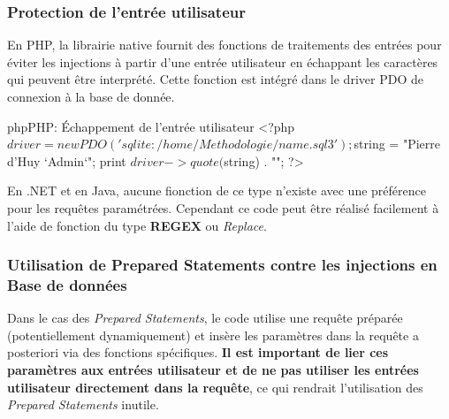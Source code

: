 \subsubsection{Protection de l'entrée utilisateur}
En PHP, la librairie native fournit des fonctions de traitements des entrées pour éviter les injections à partir d'une entrée utilisateur en échappant les caractères qui peuvent être interprété. Cette fonction est intégré dans le driver PDO de connexion à la base de donnée.
\begin{Config}{php}{PHP: Échappement de l'entrée utilisateur}
<?php
$driver = new PDO('sqlite:/home/Methodologie/name.sql3');
$string = "Pierre d'Huy `Admin`";
print $driver->quote($string) . "\n";
?>
\end{Config}

En .NET et en Java, aucune fionction de ce type n'existe avec une préférence pour les requêtes paramétrées. Cependant ce code peut être réalisé facilement à l'aide de fonction du type \textbf{\gls{REGEX}} ou \textit{Replace}.

\subsubsection{Utilisation de Prepared Statements contre les injections en Base de données}
\begin{Warning}
Dans le cas des \textit{Prepared Statements}, le code utilise une requête préparée (potentiellement dynamiquement) et insère les paramètres dans la requête a posteriori via des fonctions spécifiques. \textbf{Il est important de lier ces paramètres aux entrées utilisateur et de ne pas utiliser les entrées utilisateur directement dans la requête}, ce qui rendrait l’utilisation des \textit{Prepared Statements} inutile.
\end{Warning}

